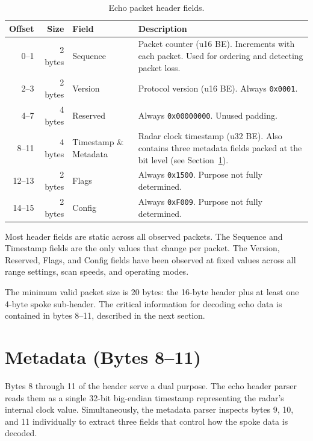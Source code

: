 \documentclass[11pt,letterpaper]{article}
\begin{document}
\begin{table}[H]
\centering
\caption{Echo packet header fields.}
\label{tab:header}
\begin{tabular}{@{}rrlp{7cm}@{}}
\toprule
\textbf{Offset} & \textbf{Size} & \textbf{Field} & \textbf{Description} \\
\midrule
0--1   & 2 bytes & Sequence  & Packet counter (u16 BE). Increments with each packet. Used for ordering and detecting packet loss. \\
2--3   & 2 bytes & Version   & Protocol version (u16 BE). Always \texttt{0x0001}. \\
4--7   & 4 bytes & Reserved  & Always \texttt{0x00000000}. Unused padding. \\
8--11  & 4 bytes & Timestamp \& Metadata & Radar clock timestamp (u32 BE). Also contains three metadata fields packed at the bit level (see Section~\ref{sec:metadata}). \\
12--13 & 2 bytes & Flags     & Always \texttt{0x1500}. Purpose not fully determined. \\
14--15 & 2 bytes & Config    & Always \texttt{0xF009}. Purpose not fully determined. \\
\bottomrule
\end{tabular}
\end{table}

Most header fields are static across all observed packets. The Sequence and Timestamp fields are the only values that change per packet. The Version, Reserved, Flags, and Config fields have been observed at fixed values across all range settings, scan speeds, and operating modes.

The minimum valid packet size is 20 bytes: the 16-byte header plus at least one 4-byte spoke sub-header. The critical information for decoding echo data is contained in bytes 8--11, described in the next section.


\section{Metadata (Bytes 8--11)}
\label{sec:metadata}

Bytes 8 through 11 of the header serve a dual purpose. The echo header parser reads them as a single 32-bit big-endian timestamp representing the radar's internal clock value. Simultaneously, the metadata parser inspects bytes 9, 10, and 11 individually to extract three fields that control how the spoke data is decoded.
\end{document}
